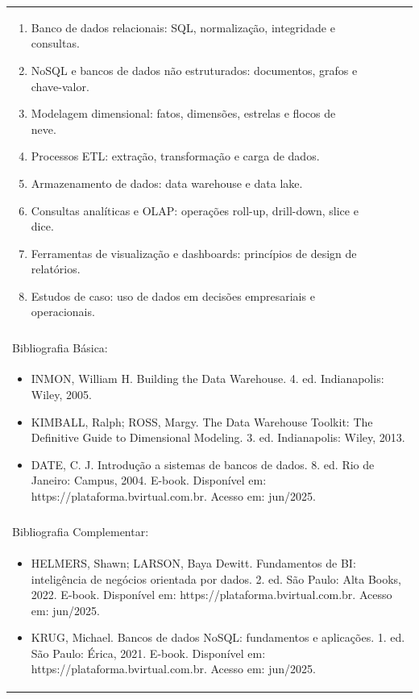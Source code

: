 \documentclass[11pt]{article}
\begin{document}
\begin{center}
\begin{longtable}{|p{4cm}|p{4cm}|p{4cm}|p{4cm}|}
{\begin{enumerate}
\item Banco de dados relacionais: SQL, normalização, integridade e consultas.
\item NoSQL e bancos de dados não estruturados: documentos, grafos e chave-valor.
\item Modelagem dimensional: fatos, dimensões, estrelas e flocos de neve.
\item Processos ETL: extração, transformação e carga de dados.
\item Armazenamento de dados: data warehouse e data lake.
\item Consultas analíticas e OLAP: operações roll-up, drill-down, slice e dice.
\item Ferramentas de visualização e dashboards: princípios de design de relatórios.
\item Estudos de caso: uso de dados em decisões empresariais e operacionais.\end{enumerate}}\\
\multicolumn{4}{|p{16cm}|}{}\\
\hline
\multicolumn{4}{|p{16cm}|}{Bibliografia Básica:}\\
\multicolumn{4}{|p{\dimexpr 16cm + 6\tabcolsep\relax}|}{%
\begin{itemize}\item INMON, William H. Building the Data Warehouse. 4. ed. Indianapolis: Wiley, 2005.
\item KIMBALL, Ralph; ROSS, Margy. The Data Warehouse Toolkit: The Definitive Guide to Dimensional Modeling. 3. ed. Indianapolis: Wiley, 2013.
\item DATE, C. J. Introdução a sistemas de bancos de dados. 8. ed. Rio de Janeiro: Campus, 2004. E-book. Disponível em: https://plataforma.bvirtual.com.br. Acesso em: jun/2025.\end{itemize}}\\
\multicolumn{4}{|p{16cm}|}{}\\
\hline
\multicolumn{4}{|p{16cm}|}{Bibliografia Complementar:}\\
\multicolumn{4}{|p{\dimexpr 16cm + 6\tabcolsep\relax}|}{%
\begin{itemize}\item HELMERS, Shawn; LARSON, Baya Dewitt. Fundamentos de BI: inteligência de negócios orientada por dados. 2. ed. São Paulo: Alta Books, 2022. E-book. Disponível em: https://plataforma.bvirtual.com.br. Acesso em: jun/2025.
\item KRUG, Michael. Bancos de dados NoSQL: fundamentos e aplicações. 1. ed. São Paulo: Érica, 2021. E-book. Disponível em: https://plataforma.bvirtual.com.br. Acesso em: jun/2025.

\end{itemize}}
\end{longtable}
\end{center}
\end{document}

